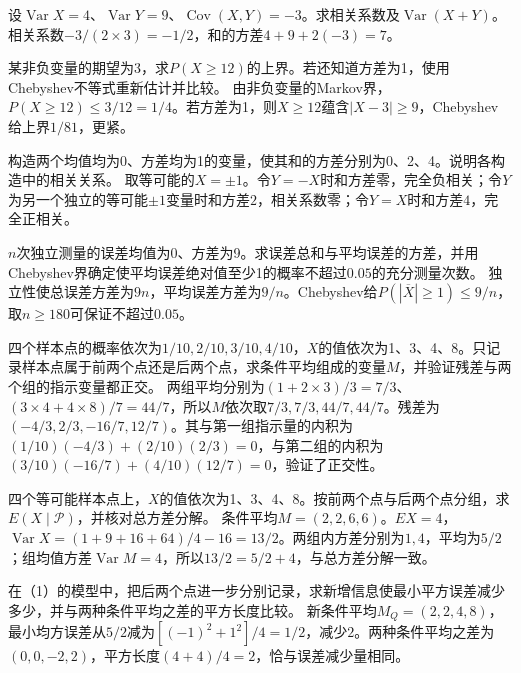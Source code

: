 设\(\operatorname{Var}X=4\)、\(\operatorname{Var}Y=9\)、\(\operatorname{Cov}(X,Y)=-3\)。求相关系数及\(\operatorname{Var}(X+Y)\)。
\solutionanswer
相关系数\(-3/(2\times3)=-1/2\)，和的方差\(4+9+2(-3)=7\)。


某非负变量的期望为3，求\(P(X\ge12)\)的上界。若还知道方差为1，使用Chebyshev不等式重新估计并比较。
\solutionanswer
由非负变量的Markov界，\(P(X\ge12)\le3/12=1/4\)。若方差为1，则\(X\ge12\)蕴含\(|X-3|\ge9\)，Chebyshev给上界\(1/81\)，更紧。


构造两个均值均为0、方差均为1的变量，使其和的方差分别为0、2、4。说明各构造中的相关关系。
\solutionanswer
取等可能的\(X=\pm1\)。令\(Y=-X\)时和方差零，完全负相关；令\(Y\)为另一个独立的等可能\(\pm1\)变量时和方差\(2\)，相关系数零；令\(Y=X\)时和方差\(4\)，完全正相关。


\(n\)次独立测量的误差均值为0、方差为9。求误差总和与平均误差的方差，并用Chebyshev界确定使平均误差绝对值至少1的概率不超过\(0.05\)的充分测量次数。
\solutionanswer
独立性使总误差方差为\(9n\)，平均误差方差为\(9/n\)。Chebyshev给\(P(|\overline X|\ge1)\le9/n\)，取\(n\ge180\)可保证不超过\(0.05\)。


四个样本点的概率依次为\(1/10,2/10,3/10,4/10\)，\(X\)的值依次为1、3、4、8。只记录样本点属于前两个点还是后两个点，求条件平均组成的变量\(M\)，并验证残差与两个组的指示变量都正交。
\solutionanswer
两组平均分别为\((1+2\times3)/3=7/3\)、\((3\times4+4\times8)/7=44/7\)，所以\(M\)依次取\(7/3,7/3,44/7,44/7\)。残差为\((-4/3,2/3,-16/7,12/7)\)。其与第一组指示量的内积为\((1/10)(-4/3)+(2/10)(2/3)=0\)，与第二组的内积为\((3/10)(-16/7)+(4/10)(12/7)=0\)，验证了正交性。


四个等可能样本点上，\(X\)的值依次为1、3、4、8。按前两个点与后两个点分组，求\(E(X\mid\mathcal P)\)，并核对总方差分解。
\solutionanswer
条件平均\(M=(2,2,6,6)\)。\(EX=4\)，\(\operatorname{Var}X=(1+9+16+64)/4-16=13/2\)。两组内方差分别为\(1,4\)，平均为\(5/2\)；组均值方差\(\operatorname{Var}M=4\)，所以\(13/2=5/2+4\)，与总方差分解一致。


在（1）的模型中，把后两个点进一步分别记录，求新增信息使最小平方误差减少多少，并与两种条件平均之差的平方长度比较。
\solutionanswer
新条件平均\(M_Q=(2,2,4,8)\)，最小均方误差从\(5/2\)减为\([(-1)^2+1^2]/4=1/2\)，减少\(2\)。两种条件平均之差为\((0,0,-2,2)\)，平方长度\((4+4)/4=2\)，恰与误差减少量相同。


